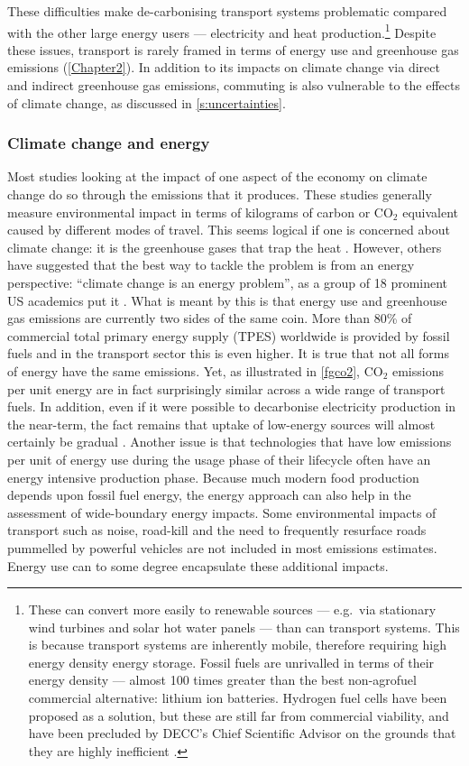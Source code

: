 These difficulties make de-carbonising transport systems problematic
compared with the other large energy users --- electricity and heat
production.\footnote{These can convert more easily to renewable
sources --- e.g.~via stationary wind turbines
and solar hot water panels --- than can transport systems.
This is because transport systems are inherently mobile,
therefore requiring high energy density energy storage.
Fossil fuels are unrivalled in terms of their energy density ---
almost 100 times greater than the best non-agrofuel commercial alternative:
lithium ion batteries. %
Hydrogen fuel cells have been proposed as a solution, but these are
still far from commercial viability, and have been 
precluded by DECC's Chief Scientific Advisor on the
grounds that they are highly inefficient \citep{MacKay2009}.}
Despite these issues, transport is rarely framed in terms of energy use and
greenhouse gas emissions (\cref{Chapter2}). In addition to
its impacts on climate change via direct and indirect greenhouse gas emissions,
commuting is also vulnerable to the effects of climate change,
as discussed in \cref{s:uncertainties}.

\subsubsection{Climate change and energy}
Most studies looking at the impact of one aspect of the economy on climate
change do so through the emissions that it produces.
These studies generally measure environmental impact in terms of kilograms of
carbon or  CO$_2$ equivalent caused by different modes of travel.
This seems logical if one is concerned about climate change:
it is the greenhouse gases that trap the heat \citep{Houghton1990}.
However, others have suggested
that the best way to tackle the problem is from an energy perspective:
``climate change is an energy problem'', as a group of 18 prominent US
academics put it \citep[p.~981]{Hoffert2002}. What is meant by this is that
energy use and greenhouse gas emissions are currently two sides of the same
coin. More than 80\% of commercial total primary energy supply (TPES)
worldwide is provided by fossil fuels \citep{Smil2008} and in the
transport sector this is even higher.
It is true that not all forms of energy have the same emissions. Yet,
as illustrated in \cref{fgco2}, CO$_2$ emissions per unit energy are
in fact surprisingly similar across a wide range of transport fuels.
In addition, even if it were possible to decarbonise electricity
production in the near-term, the fact remains that uptake of low-energy sources
will almost certainly be gradual \citep{smil2010energy}. Another issue is
that technologies that have low emissions per unit of energy use during the
usage phase of their lifecycle often have an energy intensive production
phase. Because much modern food production depends upon fossil fuel energy,
the energy approach can also help in the
assessment of wide-boundary energy impacts.
Some environmental impacts of transport such as noise, road-kill and
the need to frequently resurface roads pummelled by powerful vehicles are not
included in most emissions estimates. Energy use can to some degree
encapsulate these additional impacts.

